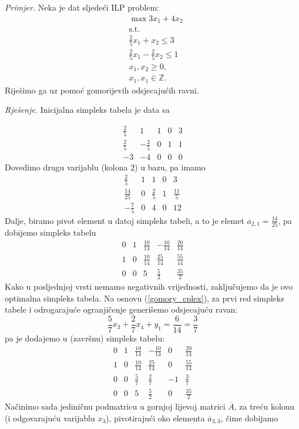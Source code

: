 \documentclass[a4paper, utf8, 11pt, colorlinks]{book}
\begin{document}
\emph{Primjer.} Neka je dat sljedeći ILP problem:\\
$$\begin{array}{ll}
    &\max 3 x_1 + 4 x_2 \\
    &\mbox{s.t. }  \\
    & \frac{2}{5}x_1 + x_2 \leq 3 \\
    &\frac{2}{5}x_1 - \frac{2}{5}x_2 \leq 1 \\
    &x_1, x_2 \geq 0, \\
    &  x_1, x_1 \in \mathbb{Z}.
\end{array}$$
Riješimo ga uz pomoć gomorijevih odsjecajućih ravni. 

\emph{Rješenje.}
Inicijalna simpleks tabela je data sa 

$$\begin{array}{cccc|c}
   \frac{2}{5}           & 1               & 1 & 0 & 3 \\
   \frac{2}{5}           & -\frac{2}{5}    & 0 & 1 & 1 \\ \hline
   -3                    &  -4             & 0 & 0 & 0
\end{array}$$
Dovedimo drugu varijablu (kolona 2) u bazu, pa imamo 
$$\begin{array}{cccc|c}
   \frac{2}{5}           & 1               & 1           & 0 & 3 \\
   \frac{14}{25}         & 0               & \frac{2}{5} & 1 & \frac{11}{5}\\ \hline
   -\frac{7}{5}                  & 0               &4 & 0 & 12
\end{array}$$
Dalje, biramo pivot element u datoj simpleks tabeli, a to je elemet $\overline{a}_{2,1} = \frac{14}{25}$, pa dobijemo simpleks tabelu
$$
\begin{array}{cccc|c}
    0    &  1  &  \frac{10}{14} &  -\frac{10}{14}  &  \frac{20}{14}                  \\
    1    &  0  &  \frac{10}{14} &   \frac{25}{14}  &   \frac{55}{14}\\ \hline
    0    &  0  &  5             &    \frac{5}{2}   &    \frac{35}{2}
\end{array}
$$
Kako u posljednjoj vrsti nemamo negativnih vrijednosti, zaključujemo da je ovo optimalna simpleks tabela. Na osnovu (\ref{gomory_cplex}),   za prvi red simpleks tabele i odrogarajuće ogranjičenje generišemo odsjecajuću ravan:
$$   \frac{5}{7}x_3 + \frac{2}{7} x_4 +      y_1   = \frac{6}{14}=\frac{3}{7}$$
pa je dodajemo u (završnu) simpleks tabelu:
$$
\begin{array}{ccccc|c}
    0    &  1  &  \frac{10}{14} &  -\frac{10}{14}  &  0 & \frac{20}{14}                  \\
    1    &  0  &  \frac{10}{14} &   \frac{25}{14}  &  0 & \frac{55}{14}\\ 
    0    &  0  & \frac{5}{7}    &   \frac{2}{7}    &  -1 & \frac{3}{7}  \\
     \hline 
    0    &  0  &  5             &    \frac{5}{2}   &  0 &    \frac{35}{2}
\end{array}
$$
Načinimo sada jediničnu podmatricu u gornjoj lijevoj matrici $\overline{A}$, za treću kolonu (i odgovarajuću varijablu $x_3$), pivotirajući oko elementa $\overline{a}_{3,3}$, čime dobijamo 
\end{document}
